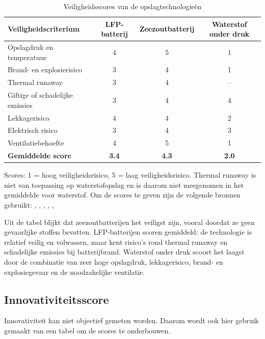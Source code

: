 \begin{table}[H]
\centering
\caption{Veiligheidsscores van de opslagtechnologieën}
\label{tab:veiligheid_scores}
\renewcommand{\arraystretch}{1.25}
\begin{tabular}{l c c c}
\hline
\textbf{Veiligheidscriterium}
& \textbf{LFP-batterij}
& \textbf{Zeezoutbatterij}
& \textbf{Waterstof onder druk} \\
\hline
Opslagdruk en temperatuur & 4 & 5 & 1 \\
Brand- en explosierisico & 3 & 4 & 1 \\
Thermal runaway & 3 & 4 & -- \\
Giftige of schadelijke emissies & 3 & 4 & 4 \\
Lekkagerisico & 4 & 4 & 2 \\
Elektrisch risico & 3 & 4 & 3 \\
Ventilatiebehoefte & 4 & 5 & 1 \\
\hline
\textbf{Gemiddelde score} & \textbf{3.4} & \textbf{4.3} & \textbf{2.0} \\
\hline
\end{tabular}

\vspace{0.2cm}
\footnotesize{Scores: 1 = hoog veiligheidsrisico, 5 = laag veiligheidsrisico. Thermal runaway is niet van toepassing op waterstofopslag en is daarom niet meegenomen in het gemiddelde voor waterstof.} Om de scores te geven zijn de volgende bronnen gebruikt: \cite{Yu2025ThermalRunawayLFP}, \cite{Tian2021SeawaterBatteries}, \cite{DOEHydrogenStorage}, \cite{Tukes2024HydrogenSafety}, \cite{Bugryniec2024GasEmissionsLIB}, \cite{DNV2026HydrogenFuelledShipsSafety}
\end{table}

\noindent Uit de tabel blijkt dat zeezoutbatterijen het veiligst zijn, vooral doordat ze geen gevaarlijke stoffen bevatten. LFP-batterijen scoren gemiddeld: de technologie is relatief veilig en volwassen, maar kent risico's rond thermal runaway en schadelijke emissies bij batterijbrand. Waterstof onder druk scoort het laagst door de combinatie van zeer hoge opslagdruk, lekkagerisico, brand- en explosiegevaar en de noodzakelijke ventilatie.\\


\subsection*{Innovativiteitsscore}
\noindent Innovativiteit kan niet objectief gemeten worden. Daarom wordt ook hier gebruik gemaakt van een tabel om de scores te onderbouwen.


